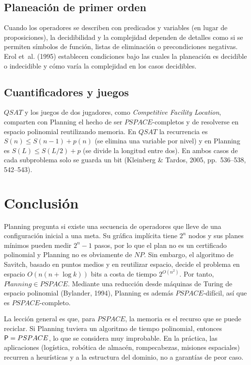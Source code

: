\documentclass[11pt,letterpaper]{article}
\theoremstyle{plain}
\theoremstyle{definition}
\theoremstyle{remark}
\newcommand{\nombreMat}[1]{\ensuremath{\text{\fontencoding{OT1}\fontfamily{cmss}\upshape\selectfont #1}}}
\newcommand{\PSPACE}{\nombreMat{PSPACE}}
\newcommand{\NP}{\nombreMat{NP}}
\newcommand{\Pclass}{\nombreMat{P}}
\newcommand{\coNP}{\nombreMat{co-NP}}
\newcommand{\QSAT}{\nombreMat{QSAT}}
\newcommand{\PLANNING}{\nombreMat{Planning}}
\newcommand{\Path}{\nombreMat{Path}}
\def\PSPACE{PSPACE}\def\NP{NP}\def\coNP{co-NP}%
\def\QSAT{QSAT}\def\PLANNING{Planning}\def\Path{Path}%
\begin{document}
\subsection{Planeación de primer orden}
Cuando los operadores se describen con predicados y variables (en lugar de proposiciones), la decidibilidad y la complejidad dependen de detalles como si se permiten símbolos de función, listas de eliminación o precondiciones negativas.
Erol et~al. (1995) establecen condiciones bajo las cuales la planeación es decidible o indecidible y cómo varía la complejidad en los casos decidibles.

\subsection{Cuantificadores y juegos}
$\QSAT$ y los juegos de dos jugadores, como \emph{Competitive Facility Location}, comparten con \PLANNING{} el hecho de ser $\PSPACE$-completos y de resolverse en espacio polinomial reutilizando memoria. En $\QSAT$ la recurrencia es $S(n)\le S(n-1)+p(n)$ (se elimina una variable por nivel) y en \PLANNING{} es
$S(L)\le S(L/2)+p$ (se divide la longitud entre dos). En ambos casos de cada subproblema solo se guarda un bit (Kleinberg \& Tardos, 2005, pp.~536--538, 542--543).

\section{Conclusión}

\PLANNING{} pregunta si existe una secuencia de operadores que lleve de una configuración inicial a una meta. Su gráfica implícita tiene $2^{n}$ nodos y sus planes mínimos pueden medir $2^{n}-1$ pasos, por lo que el plan no es un certificado polinomial y \PLANNING{} no es obviamente de $\NP$.
Sin embargo, el algoritmo de Savitch, basado en puntos medios y en reutilizar espacio, decide el problema en espacio $O(n(n+\log k))$ bits a costa de tiempo $2^{O(n^{2})}$. Por tanto, $\PLANNING\in\PSPACE$. Mediante una reducción desde máquinas de Turing de espacio polinomial (Bylander, 1994),
\PLANNING{} es además $\PSPACE$-difícil, así que es $\PSPACE$-completo.

La lección general es que, para $\PSPACE$, la memoria es el recurso que se puede reciclar. Si \PLANNING{} tuviera un algoritmo de tiempo polinomial, entonces $\Pclass=\PSPACE$, lo que se considera muy improbable. En la práctica, las aplicaciones (logística, robótica de almacén, rompecabezas, misiones espaciales)
recurren a heurísticas y a la estructura del dominio, no a garantías de peor caso.
\end{document}
